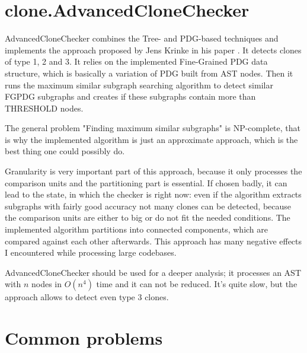 \documentclass[a0,portrait]{a0poster}
\begin{document}
\begin{multicols}{2}

\section*{clone.AdvancedCloneChecker}

AdvancedCloneChecker combines the Tree- and PDG-based techniques and implements the 
approach proposed by Jens Krinke in his paper \cite{FineGrainedPDG}. It detects clones
of type 1, 2 and 3. It relies on the implemented Fine-Grained PDG data structure, which
is basically a variation of PDG built from AST  nodes. Then it runs the maximum similar 
subgraph searching algorithm to detect similar FGPDG subgraphs and creates if these
subgraphs contain more than THRESHOLD nodes.

The general problem "Finding maximum similar subgraphs" is NP-complete, that is why the 
implemented algorithm is just an approximate approach, which is the best thing one could 
possibly do.

Granularity is very important part of this approach, because it only processes the 
comparison units and the partitioning part is essential. If chosen badly, it can lead to 
the state, in which the checker is right now: even if the algorithm extracts subgraphs 
with fairly good accuracy not many clones can be detected, because the comparison units 
are either to big or do not fit the needed conditions. The implemented algorithm 
partitions into connected components, which are compared against each other afterwards. 
This approach has many negative effects I encountered while processing large codebases.

AdvancedCloneChecker should be used for a deeper analysis; it processes an AST with $n$
nodes in $O(n^4)$ time and it can not be reduced. It's quite slow, but the approach
allows to detect even type 3 clones.


\section*{Common problems}


\end{multicols}
\end{document}
